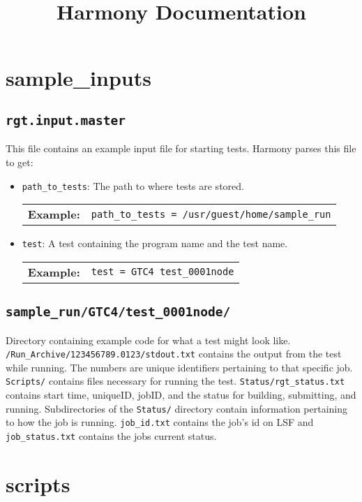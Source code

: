 \documentclass{article}
\title{Harmony Documentation}
\newcommand{\example}[1]{
\begin{tabular}{ l p{\textwidth} }
	\textbf{Example:} & \texttt{#1}
\end{tabular}
}
\newcommand{\un}[0]{\_}
\begin{document}
\maketitle

\section{sample\un inputs}

\subsection{\texttt{rgt.input.master}}

This file contains an example input file for starting tests. Harmony parses this file to get:

\begin{itemize}
	\item \texttt{path\un to\un tests}: The path to where tests are stored.

	\example{path\un to\un tests = /usr/guest/home/sample\un run}

	\item \texttt{test}: A test containing the program name and the test name.

	\example{test = GTC4 test\un 0001node}
\end{itemize}

\subsection{\texttt{sample\un run/GTC4/test\un 0001node/}}

Directory containing example code for what a test might look like.\\ \texttt{/Run\un Archive/123456789.0123/stdout.txt} contains the output from the test while running. The numbers are unique identifiers pertaining to that specific job. \texttt{Scripts/} contains files necessary for running the test. \texttt{Status/rgt\un status.txt} contains start time, uniqueID, jobID, and the status for building, submitting, and running. Subdirectories of the \texttt{Status/} directory contain information pertaining to how the job is running. \texttt{job\un id.txt} contains the job's id on LSF and \texttt{job\un status.txt} contains the jobs current status. 

\section{scripts}
\end{document}

